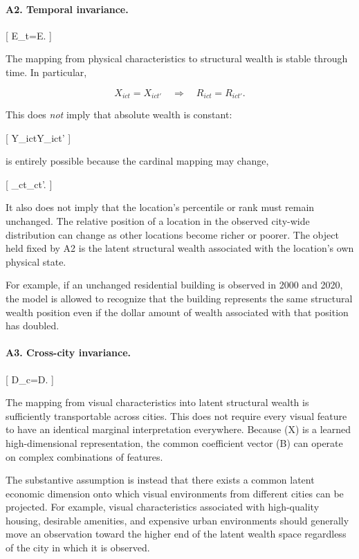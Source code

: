 \paragraph{A2. Temporal invariance.}

[
E_t=E.
]

The mapping from physical characteristics to structural wealth is stable through time. In particular,

\begin{equation}
X_{ict}=X_{ict'}
\quad\Longrightarrow\quad
R_{ict}=R_{ict'}.
\label{eq:temporal_invariance}
\end{equation}

This does \emph{not} imply that absolute wealth is constant:

[
Y_{ict}\neq Y_{ict'}
]

is entirely possible because the cardinal mapping may change,

[
\phi_{ct}\neq\phi_{ct'}.
]

It also does not imply that the location's percentile or rank must remain unchanged. The relative position of a location in the observed city-wide distribution can change as other locations become richer or poorer. The object held fixed by A2 is the latent structural wealth associated with the location's own physical state.

For example, if an unchanged residential building is observed in 2000 and 2020, the model is allowed to recognize that the building represents the same structural wealth position even if the dollar amount of wealth associated with that position has doubled.

\paragraph{A3. Cross-city invariance.}

[
D_c=D.
]

The mapping from visual characteristics into latent structural wealth is sufficiently transportable across cities. This does not require every visual feature to have an identical marginal interpretation everywhere. Because (X) is a learned high-dimensional representation, the common coefficient vector (B) can operate on complex combinations of features.

The substantive assumption is instead that there exists a common latent economic dimension onto which visual environments from different cities can be projected. For example, visual characteristics associated with high-quality housing, desirable amenities, and expensive urban environments should generally move an observation toward the higher end of the latent wealth space regardless of the city in which it is observed.

